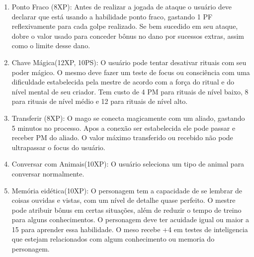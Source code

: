 \begin{enumerate}

	\item Ponto Fraco (8XP): Antes de realizar a jogada de ataque o usuário deve declarar que está usando a habilidade ponto fraco, gastando 1 PF reflexivamente para cada golpe realizado. Se bem sucedido em seu ataque, dobre o valor usado para conceder bônus no dano por sucessos extras, assim como o limite desse dano.
	
	\item  Chave Mágica(12XP, 10PS): O usuário pode tentar desativar rituais com seu poder mágico. O mesmo deve fazer um teste de focus ou consciência com uma dificuldade estabelecida pela mestre de acordo com a força do ritual e do nível mental de seu criador. Tem custo de 4 PM para rituais de nível baixo, 8 para rituais de nível médio e 12 para rituais de nível alto.
	
	\item Transferir (8XP): O mago se conecta magicamente com um aliado, gastando 5 minutos no processo. Apos a conexão ser estabelecida ele pode passar e receber PM do aliado. O valor máximo transferido ou recebido não pode ultrapassar o focus do usuário.

 	\item Conversar com Animais(10XP): O usuário seleciona um tipo de animal para conversar normalmente. 

	\item Memória eidética(10XP): O personagem tem a capacidade de se lembrar de coisas ouvidas e vistas, com um nível de detalhe quase perfeito. O mestre pode atribuir bônus em certas situações, além de reduzir o tempo de treino para alguns conhecimentos. O personagem deve ter acuidade igual ou maior a 15 para aprender essa habilidade. O meso recebe +4 em testes de inteligencia que estejam relacionados com algum conhecimento ou memoria do personagem.

	

\end{enumerate}
